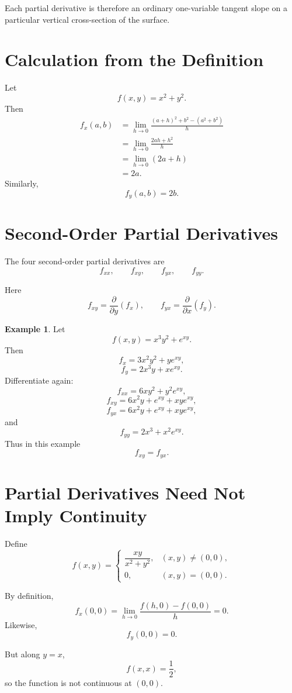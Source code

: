 \documentclass[11pt,oneside]{book}
\theoremstyle{studentthm}
\theoremstyle{definition}
\newtheorem{example}[theorem]{Example}
\begin{document}
Each partial derivative is therefore an ordinary one-variable tangent
slope on a particular vertical cross-section of the surface.


\section{Calculation from the Definition}

Let
\[
f(x,y)=x^2+y^2.
\]
Then
\[
\begin{aligned}
f_x(a,b)
&=
\lim_{h\to0}
\frac{(a+h)^2+b^2-(a^2+b^2)}{h}\\
&=
\lim_{h\to0}
\frac{2ah+h^2}{h}\\
&=
\lim_{h\to0}(2a+h)\\
&=2a.
\end{aligned}
\]
Similarly,
\[
f_y(a,b)=2b.
\]

\section{Second-Order Partial Derivatives}

The four second-order partial derivatives are
\[
f_{xx},\qquad f_{xy},\qquad f_{yx},\qquad f_{yy}.
\]

Here
\[
f_{xy}
=
\frac{\partial}{\partial y}(f_x),
\qquad
f_{yx}
=
\frac{\partial}{\partial x}(f_y).
\]

\begin{example}
Let
\[
f(x,y)=x^3y^2+e^{xy}.
\]
Then
\[
f_x=3x^2y^2+ye^{xy},
\]
\[
f_y=2x^3y+xe^{xy}.
\]
Differentiate again:
\[
f_{xx}=6xy^2+y^2e^{xy},
\]
\[
f_{xy}=6x^2y+e^{xy}+xye^{xy},
\]
\[
f_{yx}=6x^2y+e^{xy}+xye^{xy},
\]
and
\[
f_{yy}=2x^3+x^2e^{xy}.
\]
Thus in this example
\[
f_{xy}=f_{yx}.
\]
\end{example}

\section{Partial Derivatives Need Not Imply Continuity}

Define
\[
f(x,y)=
\begin{cases}
\dfrac{xy}{x^2+y^2},&(x,y)\ne(0,0),\\[1ex]
0,&(x,y)=(0,0).
\end{cases}
\]

By definition,
\[
f_x(0,0)
=
\lim_{h\to0}
\frac{f(h,0)-f(0,0)}{h}
=0.
\]
Likewise,
\[
f_y(0,0)=0.
\]

But along \(y=x\),
\[
f(x,x)=\frac12,
\]
so the function is not continuous at \((0,0)\).
\end{document}
